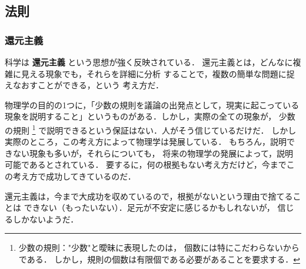         \subsection{法則}
            \subsubsection{還元主義}
            科学は \textbf{還元主義} という思想が強く反映されている．
            還元主義とは，どんなに複雑に見える現象でも，それらを詳細に分析
            することで，複数の簡単な問題に捉えなおすことができる，という
            考え方だ．

            物理学の目的の1つに，「少数の規則を議論の出発点として，現実に起こっている
            現象を説明すること」というものがある．しかし，実際の全ての現象が，
            少数の規則
                \footnote{
                    少数の規則："少数"と曖昧に表現したのは，
                    個数には特にこだわらないからである．
                    しかし，規則の個数は有限個である必要があることを要求する．
                }
            で説明できるという保証はない．人がそう信じているだけだ．
            しかし実際のところ，この考え方によって物理学は発展している．
            もちろん，説明できない現象も多いが，それらについても，
            将来の物理学の発展によって，説明可能であるとされている．
            要するに，何の根拠もない考え方だけど，今までこの考え方で成功してきているのだ．

            還元主義は，今まで大成功を収めているので，根拠がないという理由で捨てることは
            できない（もったいない）．足元が不安定に感じるかもしれないが，
            信じるしかないようだ．

